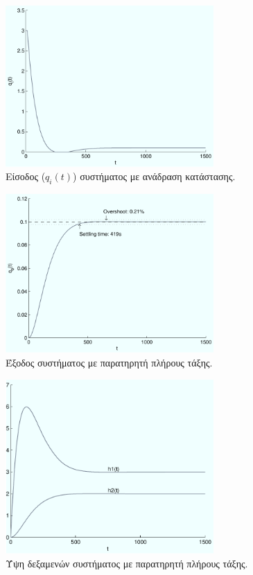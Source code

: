 \documentclass[a4paper, 11pt, english, greek]{article}
\begin{document}
\begin{figure}[htb]
  \centering
  \includegraphics[width=300px]{input_1}
  \caption{Είσοδος ($q_i(t)$) συστήματος με ανάδραση κατάστασης.}
  \label{fig:input_1}
\end{figure}

\begin{figure}[htb]
  \centering
  \includegraphics[width=300px]{output_2}
  \caption{Έξοδος συστήματος με παρατηρητή πλήρους τάξης.}
  \label{fig:output_2}
\end{figure}

\begin{figure}[htb]
  \centering
  \includegraphics[width=300px]{heights_2}
  \caption{Ύψη δεξαμενών συστήματος με παρατηρητή πλήρους τάξης.}
  \label{fig:heights_2}
\end{figure}
\end{document}
